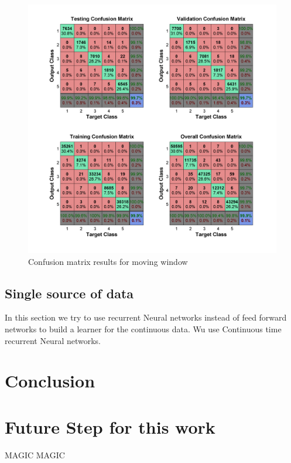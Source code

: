 \documentclass{article}
\begin{document}
\begin{figure}
 \begin{flushleft}
  \includegraphics{14_confusion}
  \caption{Confusion matrix results for moving window}
  \label{14_confusion}
 \end{flushleft}
\end{figure}


\subsection{Single source of data} 
\label{single_acc}


In this section we try to use recurrent Neural networks instead of feed forward 
networks to build a learner for the continuous data. Wu use Continuous time recurrent 
Neural networks.  


\section {Conclusion}
\label{conclusion}

\section{Future Step for this work}
MAGIC MAGIC 


{}

\end{document}
